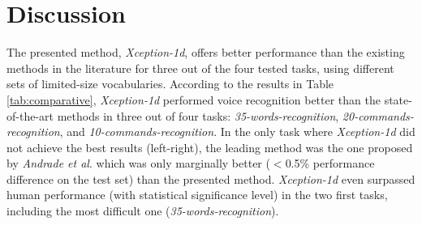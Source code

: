 \begin{table}[h!]
\begin{subtable}{1\textwidth}
\end{subtable}
\bigskip
\begin{subtable}{1\textwidth}
\caption{Results for version 2 of the dataset.}
		\centering
{}
\end{subtable}
\end{table}


\section{Discussion} \label{sec:discussion}

The presented method, \textit{Xception-1d}, offers better performance than the existing methods in the literature for three out of the four tested tasks, using different sets of limited-size vocabularies. According to the results in Table \ref{tab:comparative}, \textit{Xception-1d} performed voice recognition better than the state-of-the-art methods  \autocite{Andrade2018, Zhang2017, Mcmahan2017, Warden2018} in three out of four tasks: \textit{35-words-recognition}, \textit{20-commands-recognition}, and \textit{10-commands-recognition}. In the only task where \textit{Xception-1d} did not achieve the best results (left-right), the leading method was the one proposed by \textit{Andrade et al}. \autocite{Andrade2018} which was only marginally better ($<$0.5\% performance difference on the test set) than the presented method. \textit{Xception-1d} even surpassed human performance (with statistical significance level) in the two first tasks, including the most difficult one (\textit{35-words-recognition}).

